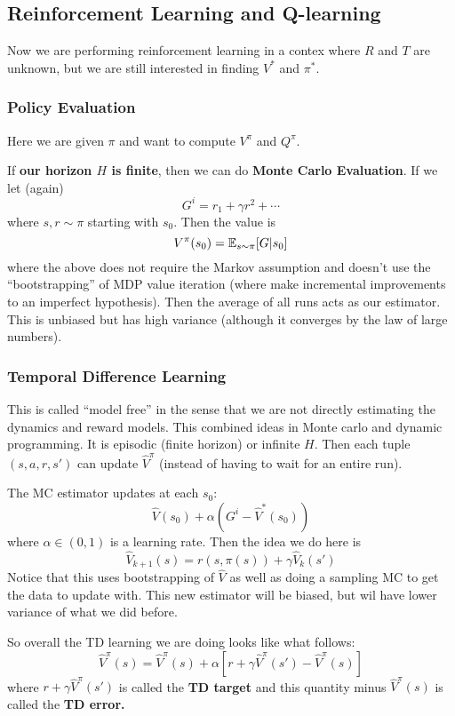 \documentclass[12pt]{article}
\begin{document}
\subsection{Reinforcement Learning and Q-learning}
Now we are performing reinforcement learning in a contex where $R$ and $T$ are unknown, but we are still interested in finding $V^\ast$ and $\pi^\ast$.

\subsubsection{Policy Evaluation}
Here we are given $\pi$ and want to compute $V^\pi$ and $Q^\pi$.

If \textbf{our horizon $H$ is finite}, then we can do \textbf{Monte Carlo Evaluation}. If we let (again)
\[G^i=r_1+\gamma r^2+\cdots\]
where $s,r\sim \pi$ starting with $s_0$. Then the value is 
\[V^\pi(s_0)=\mathbb{E}_{s\sim \pi}[G|s_0]\]
where the above does not require the Markov assumption and doesn't use the ``bootstrapping'' of MDP value iteration (where make incremental improvements to an imperfect hypothesis).
Then the average of all runs acts as our estimator. This is unbiased but has high variance (although it converges by the law of large numbers).

\subsubsection{Temporal Difference Learning}
This is called ``model free'' in the sense that we are not directly estimating the dynamics and reward models. This combined ideas in Monte carlo and dynamic programming.
It is episodic (finite horizon) or infinite $H$. Then each tuple $(s,a,r,s')$ can update $\hat V^\pi$ (instead of having to wait for an entire run).

The MC estimator updates at each $s_0$:
\[\hat V(s_0)+\alpha(G^i-\hat V^\ast(s_0))\]
where $\alpha\in(0,1)$ is a learning rate. Then the idea we do here is 
\[\hat V_{k+1}(s)=r(s,\pi(s))+\gamma\hat V_k(s')\]
Notice that this uses bootstrapping  of $\hat V$ as well as doing a sampling MC to get the data to update with.
This new estimator will be biased, but wil have lower variance of what we did before.

So overall the TD learning we are doing looks like what follows:
\[\hat V^\pi(s)=\hat V^\pi(s)+\alpha\left[r+\gamma\hat V^\pi(s')-\hat V^\pi(s)\right]\]
where $r+\gamma\hat V^\pi(s')$ is called the \textbf{TD target} and this quantity minus $\hat V^\pi(s)$ is called the \textbf{TD error.}
\end{document}
